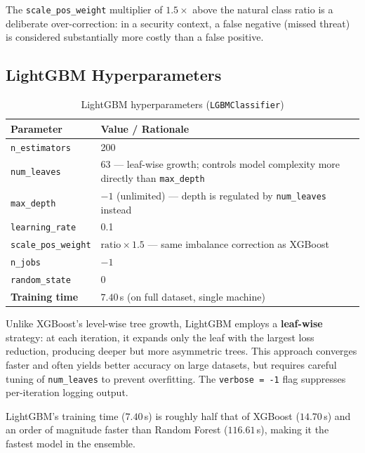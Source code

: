 \documentclass[12pt,a4paper]{article}
\begin{document}
\noindent The \texttt{scale\_pos\_weight} multiplier of $1.5\times$ above the natural class ratio is a deliberate over-correction: in a security context, a false negative (missed threat) is considered substantially more costly than a false positive.

\subsection{LightGBM Hyperparameters}

\begin{table}[H]
    \centering
    \begin{tabularx}{\textwidth}{lX}
        \toprule
        \textbf{Parameter} & \textbf{Value / Rationale} \\
        \midrule
        \texttt{n\_estimators}      & 200 \\
        \texttt{num\_leaves}        & 63 --- leaf-wise growth; controls model complexity more directly than \texttt{max\_depth} \\
        \texttt{max\_depth}         & $-1$ (unlimited) --- depth is regulated by \texttt{num\_leaves} instead \\
        \texttt{learning\_rate}     & 0.1 \\
        \texttt{scale\_pos\_weight} & $\text{ratio} \times 1.5$ --- same imbalance correction as XGBoost \\
        \texttt{n\_jobs}            & $-1$ \\
        \texttt{random\_state}      & 0 \\
        \textbf{Training time}      & $7.40$\,s (on full dataset, single machine) \\
        \bottomrule
    \end{tabularx}
    \caption{LightGBM hyperparameters (\texttt{LGBMClassifier})}
    \label{tab:lgb_params}
\end{table}

\noindent Unlike XGBoost's level-wise tree growth, LightGBM employs a \textbf{leaf-wise} strategy: at each iteration, it expands only the leaf with the largest loss reduction, producing deeper but more asymmetric trees. This approach converges faster and often yields better accuracy on large datasets, but requires careful tuning of \texttt{num\_leaves} to prevent overfitting. The \texttt{verbose = -1} flag suppresses per-iteration logging output.

LightGBM's training time ($7.40$\,s) is roughly half that of XGBoost ($14.70$\,s) and an order of magnitude faster than Random Forest ($116.61$\,s), making it the fastest model in the ensemble.
\end{document}
